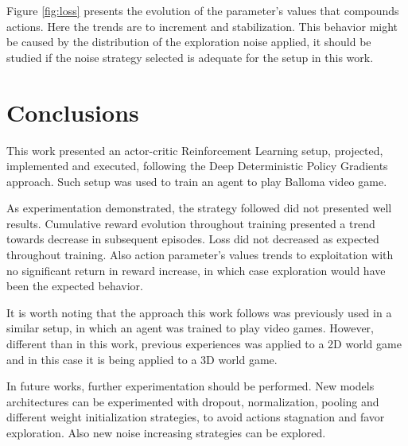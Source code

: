 \documentclass[peerreview,onecolumn]{IEEEtran}
\begin{document}
	Figure \ref{fig:loss} presents the evolution of the parameter's values that compounds actions. Here the trends are to increment and stabilization. This behavior might be caused by the distribution of the exploration noise applied, it should be studied if the noise strategy selected is adequate for the setup in this work.
	
	\section{Conclusions}
	
	This work presented an actor-critic Reinforcement Learning setup, projected, implemented and executed, following the Deep Deterministic Policy Gradients \cite{ddpg_2015} approach. Such setup was used to train an agent to play Balloma video game. 
	
	As experimentation demonstrated, the strategy followed did not presented well results. Cumulative reward evolution throughout training presented a trend towards decrease in subsequent episodes. Loss did not decreased as expected throughout training. Also action parameter's values trends to exploitation with no significant return in reward increase, in which case exploration would have been the expected behavior.
	
	It is worth noting that the approach this work follows was previously used in a similar setup, in which an agent was trained to play video games. However, different than in this work, previous experiences was applied to a 2D world game and in this case it is being applied to a 3D world game.
	
	In future works, further experimentation should be performed. New models architectures can be experimented with dropout, normalization, pooling and different weight initialization strategies, to avoid actions stagnation and favor exploration. Also new noise increasing strategies can be explored.
 
\end{document}
